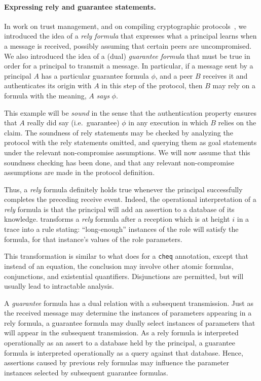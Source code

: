 \paragraph{Expressing rely and guarantee statements.}  In work on
trust management, and on compiling cryptographic
protocols~\cite{GuttmanEtAl04,GuttmanEtAl05,McCarthyEtAl07}, we
introduced the idea of a \emph{rely formula} that expresses what a
principal learns when a message is received, possibly assuming that
certain peers are uncompromised.  We also introduced the idea of a
(dual) \emph{guarantee formula} that must be true in order for a
principal to transmit a message.  In particular, if a message sent by
a principal $A$ has a particular guarantee formula $\phi$, and a peer
$B$ receives it and authenticates its origin with $A$ in this step of
the protocol, then $B$ may rely on a formula with the meaning, $A$
\emph{says} $\phi$.

This example will be \emph{sound} in the sense that the authentication
property ensures that $A$ really did say (i.e.~guarantee) $\phi$ in
any execution in which $B$ relies on the claim.  The soundness of rely
statements may be checked by analyzing the protocol with the rely
statements omitted, and querying them as goal statements under the
relevant non-compromise assumptions.  We will now assume that this
soundness checking has been done, and that any relevant non-compromise
assumptions are made in the protocol definition.

Thus, a \emph{rely} formula definitely holds true whenever the
principal successfully completes the preceding receive event.  Indeed,
the operational interpretation of a \emph{rely} formula is that the
principal will add an assertion to a database of its knowledge.
{\cpsa} transforms a \emph{rely} formula after a reception which is at
height $i$ in a trace into a rule stating:  ``long-enough'' instances
of the role will satisfy the formula, for that instance's values of
the role parameters.

This transformation is similar to what {\cpsa} does for a \texttt{cheq}
annotation, except that instead of an equation, the conclusion may
involve other atomic formulas, conjunctions, and existential
quantifiers.  Disjunctions are permitted, but will usually lead to
intractable {\cpsa} analysis.

A \emph{guarantee} formula has a dual relation with a subsequent
transmission.  Just as the received message may determine the
instances of parameters appearing in a rely formula, a guarantee
formula may dually select instances of parameters that will appear in
the subsequent transmission.  As a rely formula is interpreted
operationally as an assert to a database held by the principal, a
guarantee formula is interpreted operationally as a query against that
database.  Hence, assertions caused by previous rely formulas may
influence the parameter instances selected by subsequent guarantee
formulas.

